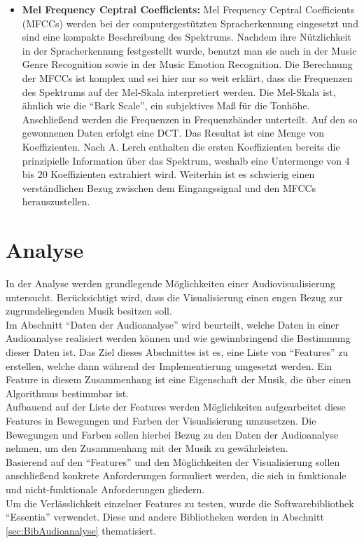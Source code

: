 \documentclass[11pt,a4paper]{article}
\begin{document}
\begin{itemize}
\item \textbf{Mel Frequency Ceptral Coefficients:} Mel Frequency Ceptral Coefficients (MFCCs) werden bei der computergestützten Spracherkennung eingesetzt und sind eine kompakte Beschreibung des Spektrums. Nachdem ihre Nützlichkeit in der Spracherkennung festgestellt wurde, benutzt man sie auch in der Music Genre Recognition sowie in der Music Emotion Recognition. Die Berechnung der MFCCs ist komplex und sei hier nur so weit erklärt, dass die Frequenzen des Spektrums auf der Mel-Skala interpretiert werden. Die Mel-Skala ist, ähnlich wie die ``Bark Scale'', ein subjektives Maß für die Tonhöhe. Anschließend werden die Frequenzen in Frequenzbänder unterteilt. Auf den so gewonnenen Daten erfolgt eine DCT. Das Resultat ist eine Menge von Koeffizienten. Nach A. Lerch \cite[S. 51ff.]{lerch2012introduction} enthalten die ersten Koeffizienten bereits die prinzipielle Information über das Spektrum, weshalb eine Untermenge von 4 bis 20 Koeffizienten extrahiert wird. Weiterhin ist es schwierig einen verständlichen Bezug zwischen dem Eingangssignal und den MFCCs herauszustellen.
\end{itemize}

\newpage

\section{Analyse}
In der Analyse werden grundlegende Möglichkeiten einer Audiovisualisierung untersucht. Berücksichtigt wird, dass die Visualisierung einen engen Bezug zur zugrundeliegenden Musik besitzen soll.\\
Im Abschnitt ``Daten der Audioanalyse'' wird beurteilt, welche Daten in einer Audioanalyse realisiert werden können und wie gewinnbringend die Bestimmung dieser Daten ist. Das Ziel dieses Abschnittes ist es, eine Liste von ``Features'' zu erstellen, welche dann während der Implementierung umgesetzt werden. Ein Feature in diesem Zusammenhang ist eine Eigenschaft der Musik, die über einen Algorithmus bestimmbar ist.\\
Aufbauend auf der Liste der Features werden Möglichkeiten aufgearbeitet diese Features in Bewegungen und Farben der Visualisierung umzusetzen. Die Bewegungen und Farben sollen hierbei Bezug zu den Daten der Audioanalyse nehmen, um den Zusammenhang mit der Musik zu gewährleisten.\\
Basierend auf den ``Features'' und den Möglichkeiten der Visualisierung sollen anschließend konkrete Anforderungen formuliert werden, die sich in funktionale und nicht-funktionale Anforderungen gliedern.\\
Um die Verlässlichkeit einzelner Features zu testen, wurde die Softwarebibliothek ``Essentia'' verwendet. Diese und andere Bibliotheken werden in Abschnitt \ref{sec:BibAudioanalyse} thematisiert.
\end{document}
